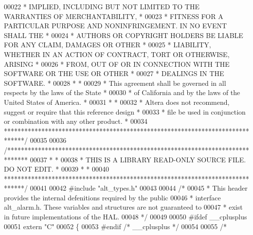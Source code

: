 \begin{DoxyCode}
00022 \textcolor{comment}{* IMPLIED, INCLUDING BUT NOT LIMITED TO THE WARRANTIES OF MERCHANTABILITY,    *}
00023 \textcolor{comment}{* FITNESS FOR A PARTICULAR PURPOSE AND NONINFRINGEMENT. IN NO EVENT SHALL THE *}
00024 \textcolor{comment}{* AUTHORS OR COPYRIGHT HOLDERS BE LIABLE FOR ANY CLAIM, DAMAGES OR OTHER      *}
00025 \textcolor{comment}{* LIABILITY, WHETHER IN AN ACTION OF CONTRACT, TORT OR OTHERWISE, ARISING     *}
00026 \textcolor{comment}{* FROM, OUT OF OR IN CONNECTION WITH THE SOFTWARE OR THE USE OR OTHER         *}
00027 \textcolor{comment}{* DEALINGS IN THE SOFTWARE.                                                   *}
00028 \textcolor{comment}{*                                                                             *}
00029 \textcolor{comment}{* This agreement shall be governed in all respects by the laws of the State   *}
00030 \textcolor{comment}{* of California and by the laws of the United States of America.              *}
00031 \textcolor{comment}{*                                                                             *}
00032 \textcolor{comment}{* Altera does not recommend, suggest or require that this reference design    *}
00033 \textcolor{comment}{* file be used in conjunction or combination with any other product.          *}
00034 \textcolor{comment}{******************************************************************************/}
00035 
00036 \textcolor{comment}{/******************************************************************************}
00037 \textcolor{comment}{*                                                                             *}
00038 \textcolor{comment}{* THIS IS A LIBRARY READ-ONLY SOURCE FILE. DO NOT EDIT.                       *}
00039 \textcolor{comment}{*                                                                             *}
00040 \textcolor{comment}{******************************************************************************/}
00041 
00042 \textcolor{preprocessor}{#include "alt_types.h"}
00043 
00044 \textcolor{comment}{/*}
00045 \textcolor{comment}{ * This header provides the internal defenitions required by the public }
00046 \textcolor{comment}{ * interface alt\_alarm.h. These variables and structures are not guaranteed to }
00047 \textcolor{comment}{ * exist in future implementations of the HAL.}
00048 \textcolor{comment}{ */}
00049 
00050 \textcolor{preprocessor}{#ifdef \_\_cplusplus}
00051 \textcolor{keyword}{extern} \textcolor{stringliteral}{"C"}
00052 \{
00053 \textcolor{preprocessor}{#endif }\textcolor{comment}{/* \_\_cplusplus */}\textcolor{preprocessor}{}
00054 
00055 \textcolor{comment}{/*}

\end{DoxyCode}
